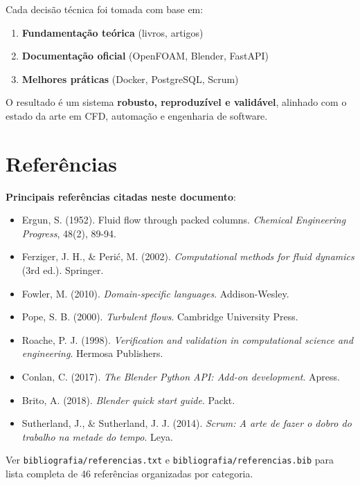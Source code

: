 \documentclass[12pt,a4paper]{article}
\begin{document}
Cada decisão técnica foi tomada com base em:
\begin{enumerate}
    \item \textbf{Fundamentação teórica} (livros, artigos)
    \item \textbf{Documentação oficial} (OpenFOAM, Blender, FastAPI)
    \item \textbf{Melhores práticas} (Docker, PostgreSQL, Scrum)
\end{enumerate}

O resultado é um sistema \textbf{robusto, reproduzível e validável}, alinhado com o estado da arte em CFD, automação e engenharia de software.

\section{Referências}

\textbf{Principais referências citadas neste documento}:

\begin{itemize}
    \item Ergun, S. (1952). Fluid flow through packed columns. \textit{Chemical Engineering Progress}, 48(2), 89-94.
    \item Ferziger, J. H., \& Perić, M. (2002). \textit{Computational methods for fluid dynamics} (3rd ed.). Springer.
    \item Fowler, M. (2010). \textit{Domain-specific languages}. Addison-Wesley.
    \item Pope, S. B. (2000). \textit{Turbulent flows}. Cambridge University Press.
    \item Roache, P. J. (1998). \textit{Verification and validation in computational science and engineering}. Hermosa Publishers.
    \item Conlan, C. (2017). \textit{The Blender Python API: Add-on development}. Apress.
    \item Brito, A. (2018). \textit{Blender quick start guide}. Packt.
    \item Sutherland, J., \& Sutherland, J. J. (2014). \textit{Scrum: A arte de fazer o dobro do trabalho na metade do tempo}. Leya.
\end{itemize}

Ver \texttt{bibliografia/referencias.txt} e \texttt{bibliografia/referencias.bib} para lista completa de 46 referências organizadas por categoria.
\end{document}

